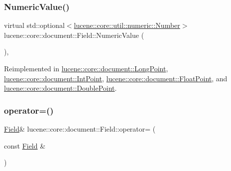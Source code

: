 \mbox{\label{classlucene_1_1core_1_1document_1_1Field_a858814043215c98bacf6ecc823d078ea}} 
\subsubsection{\texorpdfstring{Numeric\+Value()}{NumericValue()}}
{\footnotesize\ttfamily virtual std\+::optional$<$\mbox{\hyperlink{classlucene_1_1core_1_1util_1_1numeric_1_1Number}{lucene\+::core\+::util\+::numeric\+::\+Number}}$>$ lucene\+::core\+::document\+::\+Field\+::\+Numeric\+Value (\begin{DoxyParamCaption}{ }\end{DoxyParamCaption})\hspace{0.3cm}{\ttfamily [inline]}, {\ttfamily [virtual]}}



Reimplemented in \mbox{\hyperlink{classlucene_1_1core_1_1document_1_1LongPoint_a24068a492dbb14946de8de3bde3bd87b}{lucene\+::core\+::document\+::\+Long\+Point}}, \mbox{\hyperlink{classlucene_1_1core_1_1document_1_1IntPoint_a738e9e2cc41c77f835aac8f06da801ac}{lucene\+::core\+::document\+::\+Int\+Point}}, \mbox{\hyperlink{classlucene_1_1core_1_1document_1_1FloatPoint_ac2f070785fcce64c8214bb851fb6087c}{lucene\+::core\+::document\+::\+Float\+Point}}, and \mbox{\hyperlink{classlucene_1_1core_1_1document_1_1DoublePoint_aff495d94ea271af89212706b21aa3196}{lucene\+::core\+::document\+::\+Double\+Point}}.

\mbox{\label{classlucene_1_1core_1_1document_1_1Field_a9a165fa3cc612d355b6f3ef5deb87d50}} 
\subsubsection{\texorpdfstring{operator=()}{operator=()}\hspace{0.1cm}{\footnotesize\ttfamily [1/2]}}
{\footnotesize\ttfamily \mbox{\hyperlink{classlucene_1_1core_1_1document_1_1Field}{Field}}\& lucene\+::core\+::document\+::\+Field\+::operator= (\begin{DoxyParamCaption}\item[{const \mbox{\hyperlink{classlucene_1_1core_1_1document_1_1Field}{Field}} \&}]{ }\end{DoxyParamCaption})\hspace{0.3cm}{\ttfamily [delete]}}

